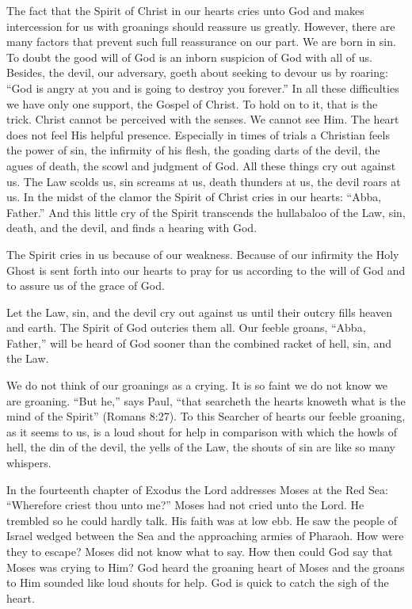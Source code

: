 The fact that the Spirit of Christ in our hearts cries unto God and makes intercession for us with groanings should reassure us greatly. However, there are many factors that prevent such full reassurance on our part. We are born in sin. To doubt the good will of God is an inborn suspicion of God with all of us. Besides, the devil, our adversary, goeth about seeking to devour us by roaring: “God is angry at you and is going to destroy you forever.” In all these difficulties we have only one support, the Gospel of Christ. To hold on to it, that is the trick. Christ cannot be perceived with the senses. We cannot see Him. The heart does not feel His helpful presence. Especially in times of trials a Christian feels the power of sin, the infirmity of his flesh, the goading darts of the devil, the agues of death, the scowl and judgment of God. All these things cry out against us. The Law scolds us, sin screams at us, death thunders at us, the devil roars at us. In the midst of the clamor the Spirit of Christ cries in our hearts: “Abba, Father.” And this little cry of the Spirit transcends the hullabaloo of the Law, sin, death, and the devil, and finds a hearing with God.

The Spirit cries in us because of our weakness. Because of our infirmity the Holy Ghost is sent forth into our hearts to pray for us according to the will of God and to assure us of the grace of God.

Let the Law, sin, and the devil cry out against us until their outcry fills heaven and earth. The Spirit of God outcries them all. Our feeble groans, “Abba, Father,” will be heard of God sooner than the combined racket of hell, sin, and the Law.

We do not think of our groanings as a crying. It is so faint we do not know we are groaning. “But he,” says Paul, “that searcheth the hearts knoweth what is the mind of the Spirit” (Romans 8:27). To this Searcher of hearts our feeble groaning, as it seems to us, is a loud shout for help in comparison with which the howls of hell, the din of the devil, the yells of the Law, the shouts of sin are like so many whispers.

In the fourteenth chapter of Exodus the Lord addresses Moses at the Red Sea: “Wherefore criest thou unto me?” Moses had not cried unto the Lord. He trembled so he could hardly talk. His faith was at low ebb. He saw the people of Israel wedged between the Sea and the approaching armies of Pharaoh. How were they to escape? Moses did not know what to say. How then could God say that Moses was crying to Him? God heard the groaning heart of Moses and the groans to Him sounded like loud shouts for help. God is quick to catch the sigh of the heart.

